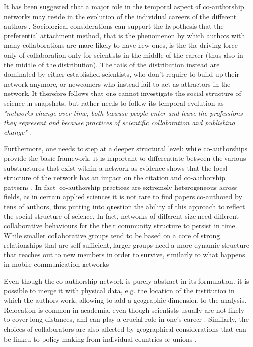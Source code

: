  It has been suggested that a major role in the temporal aspect of co-authorship networks 
 may reside in the evolution of the individual careers of the different authors \cite{Wagner20051608}. Sociological considerations \cite{Gursey} can support the hypothesis that the preferential attachment method, that is the 
 phenomenon by which authors with many collaborations are more likely to have new ones,
 is the the driving force only of collaboration only for scientists in the middle of the career (thus also in the middle
of the distribution). The tails of the distribution instead are dominated by either established scientists, who don't require to build up their network anymore, or newcomers who instead fail to act as attractors
 in the network. It therefore follows that one cannot investigate the social structure of science in snapshots, but rather needs to follow its temporal evolution as  \textit{"networks
change over time, both because people enter and
leave the professions they represent and because practices
of scientific collaboration and publishing change"} \cite{Newman2004Connected}. 

Furthermore, one needs to step at a deeper structural level:
 while co-authorships provide the basic framework, it is important to differentiate between the various substructures that exist within a network as evidence shows that the local structure of the network
 has an impact on the citation and co-authorship patterns \cite{10.1371/journal.pone.0057546}. In fact, co-authorship practices are extremely heterogeneous across fields, as in certain applied sciences it is not rare
 to find papers co-authored by tens of authors, thus putting into question the ability of this approach to reflect the social structure of science. In fact, networks of different size need different collaborative behaviours for the 
 their community structure to persist in time. While smaller collaborative groups tend to be based on a core of strong relationships that are self-sufficient, larger groups need a more dynamic structure that
 reaches out to new members in order to survive, similarly to what happens in mobile communication networks \cite{Palla2007}. 

 Even though the co-authorship network is purely abstract in its formulation, it is possible to merge it with physical data, e.g. the location of the institution in which the authors work, allowing to add a 
 geographic dimension to the analysis. Relocation is common in academia, even though scientists usually are not likely to cover long distances, and can play a crucial role in one's career \cite{Deville2014}.
 Similarly, the choices of collaborators are also affected by geographical considerations that can be linked to policy making from individual countries or unions \cite{Hoekman2010662,Leydesdorff2008317}.


